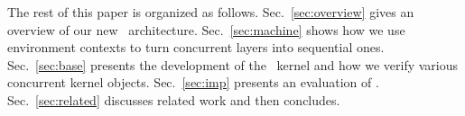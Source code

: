 The rest of this paper is organized as follows.
Sec.~\ref{sec:overview} gives an overview of our new
\CTOS\ architecture. Sec.~\ref{sec:machine} shows how we use
environment contexts to turn concurrent layers into sequential ones. 
Sec.~\ref{sec:base} presents the development of the
\mCTOS\ kernel and how we verify various concurrent kernel
objects. Sec.~\ref{sec:imp} presents an evaluation of \CTOS. 
Sec.~\ref{sec:related} discusses related work and then concludes.




